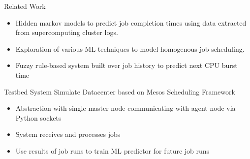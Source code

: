 \documentclass[unknownkeysallowed, final]{beamer}
\begin{document}
\begin{frame}
\begin{columns}[t]
\begin{column}{.33\linewidth}
\begin{block}{Related Work}	
	\begin{itemize}
        \item Hidden markov models to predict job completion times using data extracted from supercomputing cluster logs. \cite{predictjobcompletion}
        \item Exploration of various ML techniques to model homogenous job scheduling. \cite{helmy2015machine}
        \item Fuzzy rule-based system built over job history to predict next CPU burst time \cite{fuzzycpu}
	\end{itemize}
\end{block}
\begin{block}{Testbed System}
Simulate Datacenter based on Mesos Scheduling Framework
\begin{itemize}
    \item Abstraction with single master node communicating with agent node via Python sockets
    \item System receives and processes jobs
    \item Use results of job runs to train ML predictor for future job runs
\end{itemize}
\end{block}


\end{column}
\end{columns}
\end{frame}
\end{document}
